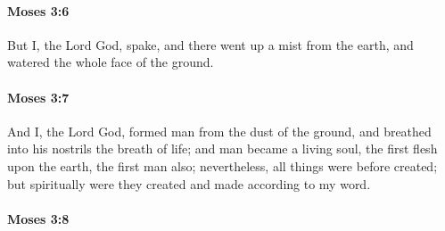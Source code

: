
		\paragraph{Moses 3:6} %
			\label{MOSES-3-6}

			But I, the Lord God, spake, and there went up a mist from the earth, and watered the whole face of the ground.


		\paragraph{Moses 3:7} %
			\label{MOSES-3-7}

			And I, the Lord God, formed man from the dust of the ground, and breathed into his nostrils the breath of life; and man became a living soul, the first flesh upon the earth, the first man also; nevertheless, all things were before created; but spiritually were they created and made according to my word.


		\paragraph{Moses 3:8} %
			\label{MOSES-3-8}

